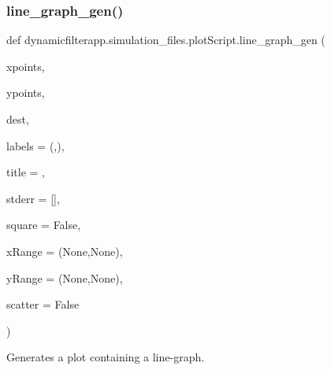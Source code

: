 \subsubsection{\texorpdfstring{line\+\_\+graph\+\_\+gen()}{line\_graph\_gen()}}
{\footnotesize\ttfamily def dynamicfilterapp.\+simulation\+\_\+files.\+plot\+Script.\+line\+\_\+graph\+\_\+gen (\begin{DoxyParamCaption}\item[{}]{xpoints,  }\item[{}]{ypoints,  }\item[{}]{dest,  }\item[{}]{labels = {\ttfamily (\textquotesingle{}\textquotesingle{},\textquotesingle{}\textquotesingle{})},  }\item[{}]{title = {\ttfamily \textquotesingle{}\textquotesingle{}},  }\item[{}]{stderr = {\ttfamily \mbox{[}\mbox{]}},  }\item[{}]{square = {\ttfamily False},  }\item[{}]{x\+Range = {\ttfamily (None,None)},  }\item[{}]{y\+Range = {\ttfamily (None,None)},  }\item[{}]{scatter = {\ttfamily False} }\end{DoxyParamCaption})}



Generates a plot containing a line-\/graph. 


